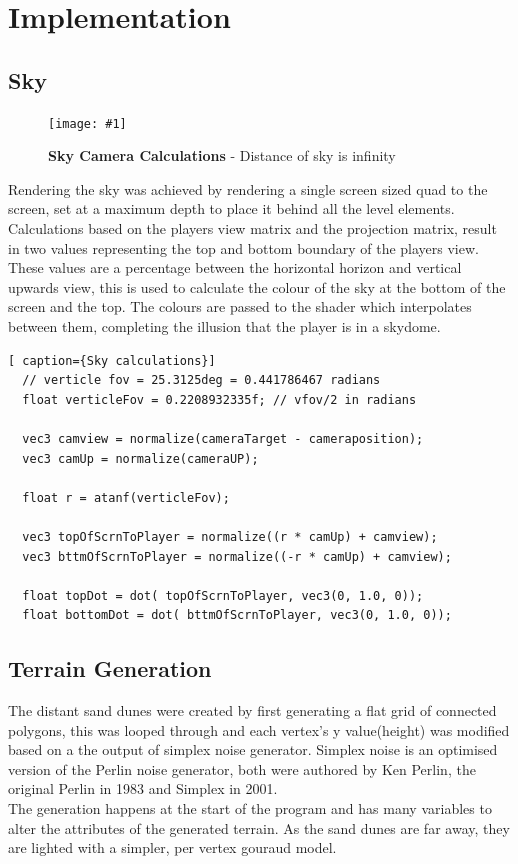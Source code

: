 \documentclass[conference]{acmsiggraph}
\newcommand{\figuremacroW}[4]{
	\begin{figure}[h] %
		\centering
		\texttt{[image: \#1]}
		\caption[#2]{\textbf{#2} - #3}
		\label{fig:#1}
	\end{figure}
}
\begin{document}
\section{Implementation}

\subsection{Sky}

\figuremacroW
{skydaigram}
{Sky Camera Calculations}
{Distance of sky is infinity}
{1.0}
Rendering the sky was achieved by rendering a single screen sized quad to the screen, set at a maximum depth to place it behind all the level elements. Calculations based on the players view matrix and the projection matrix, result in two values representing the top and bottom boundary of the players view. These values are a percentage between the horizontal horizon and vertical upwards view, this is used to calculate the colour of the sky at the bottom of the screen and the top. The colours are passed to the shader which interpolates between them, completing the illusion that the player is in a skydome.

\begin{lstlisting}[ caption={Sky calculations}]
  // verticle fov = 25.3125deg = 0.441786467 radians
  float verticleFov = 0.2208932335f; // vfov/2 in radians

  vec3 camview = normalize(cameraTarget - cameraposition);
  vec3 camUp = normalize(cameraUP);

  float r = atanf(verticleFov);

  vec3 topOfScrnToPlayer = normalize((r * camUp) + camview);
  vec3 bttmOfScrnToPlayer = normalize((-r * camUp) + camview);

  float topDot = dot( topOfScrnToPlayer, vec3(0, 1.0, 0));
  float bottomDot = dot( bttmOfScrnToPlayer, vec3(0, 1.0, 0));
\end{lstlisting}


\subsection{Terrain Generation}
The distant sand dunes were created by first generating a flat grid of connected polygons, this was looped through and each vertex's y value(height) was modified based on a the output of simplex noise generator. Simplex noise is an optimised version of the Perlin noise generator, both were authored by Ken Perlin, the original Perlin in 1983 and Simplex in 2001.\\
The generation happens at the start of the program and has many variables to alter the attributes of the generated terrain. As the sand dunes are far away, they are lighted with a simpler, per vertex gouraud model.
\end{document}
